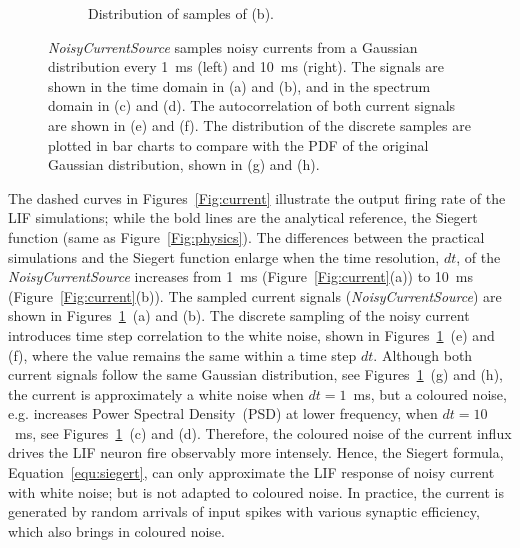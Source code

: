 \begin{figure}[tbp!]
\begin{subfigure}[t]{0.43\textwidth}
			\caption{Distribution of samples of (b).}
		\end{subfigure}
		\caption[\textit{NoisyCurrentSource} samples from a Gaussian distribution.]{\textit{NoisyCurrentSource} samples noisy currents from a Gaussian distribution every 1~ms (left) and 10~ms (right). The signals are shown in the time domain in (a) and (b), and in the spectrum domain in (c) and (d). The autocorrelation of both current signals are shown in (e) and (f). The distribution of the discrete samples are plotted in bar charts to compare with the PDF of the original Gaussian distribution, shown in (g) and (h).}
		\label{Fig:lif_curr}
	\end{figure}
	
	The dashed curves in Figures~\ref{Fig:current} illustrate the output firing rate of the LIF simulations; while the bold lines are the analytical reference, the Siegert function (same as Figure~\ref{Fig:physics}).
	The differences between the practical simulations and the Siegert function enlarge when the time resolution, $dt$, of the \textit{NoisyCurrentSource} increases from 1~ms (Figure~\ref{Fig:current}(a)) to 10~ms (Figure~\ref{Fig:current}(b)).
	The sampled current signals (\textit{NoisyCurrentSource}) are shown in Figures~\ref{Fig:lif_curr}~(a) and (b).
	The discrete sampling of the noisy current introduces time step correlation to the white noise, shown in Figures~\ref{Fig:lif_curr}~(e) and (f), where the value remains the same within a time step $dt$.
	Although both current signals follow the same Gaussian distribution, see Figures~\ref{Fig:lif_curr}~(g) and (h), the current is approximately a white noise when $dt=1$~ms, but a coloured noise, e.g. increases Power Spectral Density~(PSD) at lower frequency, when $dt=10$~ms, see Figures~\ref{Fig:lif_curr}~(c) and (d).
	Therefore, the coloured noise of the current influx drives the LIF neuron fire observably more intensely.
	Hence, the Siegert formula, Equation~\ref{equ:siegert}, can only approximate the LIF response of noisy current with white noise; but is not adapted to coloured noise.
	In practice, the current is generated by random arrivals of input spikes with various synaptic efficiency, which also brings in coloured noise.
